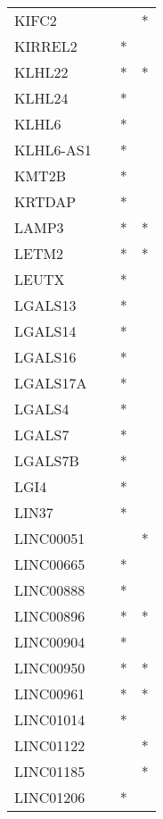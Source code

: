 \begin{longtable}{lccc}
KIFC2        &           &     &       * \\
KIRREL2      &           &   * &         \\
KLHL22       &           &   * &       * \\
KLHL24       &           &   * &         \\
KLHL6        &           &   * &         \\
KLHL6-AS1    &           &   * &         \\
KMT2B        &           &   * &         \\
KRTDAP       &           &   * &         \\
LAMP3        &           &   * &       * \\
LETM2        &           &   * &       * \\
LEUTX        &           &   * &         \\
LGALS13      &           &   * &         \\
LGALS14      &           &   * &         \\
LGALS16      &           &   * &         \\
LGALS17A     &           &   * &         \\
LGALS4       &           &   * &         \\
LGALS7       &           &   * &         \\
LGALS7B      &           &   * &         \\
LGI4         &           &   * &         \\
LIN37        &           &   * &         \\
LINC00051    &           &     &       * \\
LINC00665    &           &   * &         \\
LINC00888    &           &   * &         \\
LINC00896    &           &   * &       * \\
LINC00904    &           &   * &         \\
LINC00950    &           &   * &       * \\
LINC00961    &           &   * &       * \\
LINC01014    &           &   * &         \\
LINC01122    &           &     &       * \\
LINC01185    &           &     &       * \\
LINC01206    &           &   * &         \\

\end{longtable}
